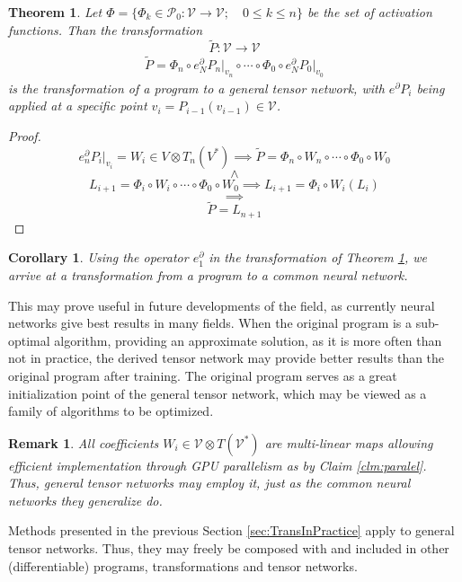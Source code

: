 \documentclass{article}
\newcommand{\VV}{\mathcal{V}}
\newcommand{\dP}{\mathcal{P}}
\newcommand{\D}{\partial}
\newtheorem{izrek}{Theorem}[section]
\newtheorem{opomba}{Remark}[section]
\newtheorem{corollary}{Corollary}[section]
\begin{document}
\begin{izrek}\label{izr:transToTensorNet}
Let $\Phi=\{\Phi_k\in\dP_0:\VV\to\VV;\quad 0\le k\le n\}$ be the set of activation functions. Than the transformation
\begin{equation}
\tilde{P}:\VV\to\VV
\end{equation}
\begin{eqnarray}
\tilde{P}=\Phi_n\circ e^\D_NP_n\vert_{v_n}\circ\cdots\circ\Phi_0\circ e^\D_NP_0\vert_{v_0}
\end{eqnarray}
is the transformation of a program to a general tensor network, with $e^\D P_i$ being applied at a specific point $v_{i}=P_{i-1}(v_{i-1})\in \VV$.
\end{izrek}
\begin{proof}
$$e^\D_n P_i\vert_{v_i}=W_i\in V\otimes T_n(V^*)\implies\tilde{P}=\Phi_n\circ W_n\circ\cdots\circ\Phi_0\circ W_0$$
$$\land$$
$$L_{i+1}=\Phi_i\circ W_i\circ\cdots\circ\Phi_0\circ W_0\implies L_{i+1}=\Phi_i\circ W_i(L_i)$$
$$\implies$$
$$\tilde{P}=L_{n+1}$$
\end{proof}

\begin{corollary}
Using the operator $e^ \D_1$ in the transformation of Theorem \ref{izr:transToTensorNet}, we arrive at a transformation from a program to a common neural network.
\end{corollary}

This may prove useful in future developments of the field, as currently neural networks give best results in many fields. When the original program is a sub-optimal algorithm, providing an approximate solution, as it is more often than not in practice, the derived tensor network may provide better results than the original program after training. The original program serves as a great initialization point of the general tensor network, which may be viewed as a family of algorithms to be optimized. 

\begin{opomba}
All coefficients $W_i\in \VV\otimes T(\VV^*)$ are multi-linear maps allowing efficient implementation through GPU parallelism as by Claim \ref{clm:paralel}. Thus, general tensor networks may employ it, just as the common neural networks they generalize do.
\end{opomba}

Methods presented in the previous Section \ref{sec:TransInPractice} apply to general tensor networks. Thus, they may freely be composed with and included in other (differentiable) programs, transformations and tensor networks.
\end{document}
